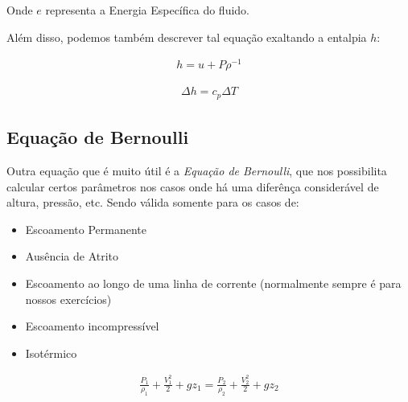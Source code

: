 \documentclass{article}
\begin{document}
Onde $e$ representa a Energia Específica do fluido.

Além disso, podemos também descrever tal equação exaltando a entalpia $h$:

\begin{minipage}{.5\textwidth}
    \begin{align*}
        h = u + P \rho^{-1}
    \end{align*}
\end{minipage}
\begin{minipage}{.5\textwidth}
    \begin{align*}
        \Delta h = c_p \Delta T
    \end{align*}
\end{minipage}

\subsection{Equação de Bernoulli}
Outra equação que é muito útil é a \emph{Equação de Bernoulli}, que nos possibilita calcular certos parâmetros nos casos onde há uma diferênça considerável de altura, pressão, etc. Sendo válida somente para os casos de:
\begin{itemize}
    \item Escoamento Permanente
    \item Ausência de Atrito
    \item Escoamento ao longo de uma linha de corrente (normalmente sempre é para nossos exercícios)
    \item Escoamento incompressível
    \item Isotérmico
\end{itemize}

\begin{align}
    \frac{P_1}{\rho_1} + \frac{V^2_1}{2} + gz_1 = \frac{P_2}{\rho_2} + \frac{V^2_2}{2} + gz_2
\end{align}
\end{document}
